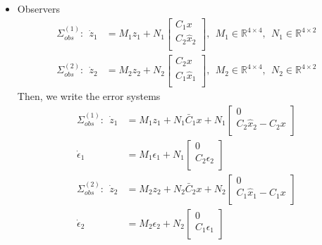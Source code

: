 \documentclass{beamer}
\newcommand{\R}{\mathbb{R}}
\begin{document}
\begin{frame}{\color{blue} }

\begin{itemize}

  \item Observers
\begin{align*}
\Sigma_{obs}^{(1)}:~~ \dot{z}_{1}&=M_{1}z_{1}+ N_{1}\begin{bmatrix} C_{1}x \\ C_{2}\hat{x}_{2} \\ \end{bmatrix},~~ M_{1}\in\R^{4\times4},~~ N_{1}\in\R^{4\times2} \\
\Sigma_{obs}^{(2)}:~~ \dot{z}_{2}&=M_{2}z_{2}+ N_{2}\begin{bmatrix} C_{2}x \\ C_{1}\hat{x}_{1} \\ \end{bmatrix},~~ M_{2}\in\R^{4\times4},~~ N_{2}\in\R^{4\times2}
\end{align*}
Then, we write the error systems
\begin{align*}
\Sigma_{obs}^{(1)}:~~ \dot{z}_{1}&=M_{1}z_{1}+ N_{1}\bar{C}_{1}x + N_{1}\begin{bmatrix} 0 \\ C_{2}\hat{x}_{2}-C_{2}x \\ \end{bmatrix} \\
\dot{\epsilon}_{1}&=M_{1}\epsilon_{1}+ N_{1}\begin{bmatrix} 0 \\ C_{2}\epsilon_{2} \\ \end{bmatrix} \\
\Sigma_{obs}^{(2)}:~~ \dot{z}_{2}&=M_{2}z_{2}+ N_{2}\bar{C}_{2}x + N_{2}\begin{bmatrix} 0 \\ C_{1}\hat{x}_{1}-C_{1}x \\ \end{bmatrix} \\
\dot{\epsilon}_{2}&=M_{2}\epsilon_{2}+ N_{2}\begin{bmatrix} 0 \\ C_{1}\epsilon_{1} \\ \end{bmatrix}
\end{align*}

\end{itemize}

\end{frame}
\end{document}
